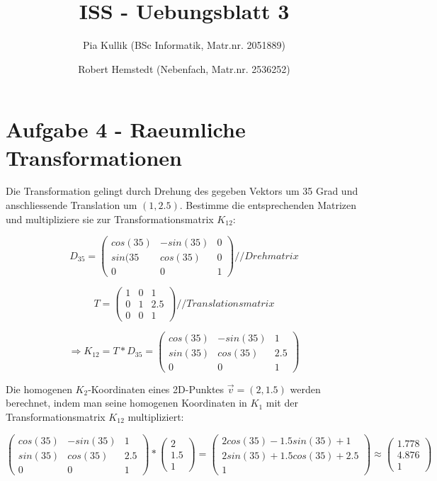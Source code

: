 \documentclass[10pt]{article}
\begin{document}
\title{ISS - Uebungsblatt 3}
\author{Pia Kullik (BSc Informatik, Matr.nr. 2051889) \and Robert Hemstedt (Nebenfach, Matr.nr. 2536252)}
\maketitle

\section{Aufgabe 4 - Raeumliche Transformationen}

Die Transformation gelingt durch Drehung des gegeben Vektors um 35 Grad und anschliessende Translation um $(1, 2.5)$. Bestimme die entsprechenden Matrizen und multipliziere sie zur Transformationsmatrix $K_{12}$:


\[
D_{35} =
\left( {\begin{array}{ccc}
cos(35) & -sin(35) & 0\\
sin(35 & cos(35) & 0\\
0 & 0 & 1
\end{array} } \right) 
//Drehmatrix
\]

\[
T =
\left( {\begin{array}{ccc}
1 & 0 & 1\\
0 & 1 & 2.5 \\
0 & 0 & 1
\end{array} } \right) 
//Translationsmatrix
\]

\[
\Rightarrow K_{12} = T \ast D_{35} =
\left( {\begin{array}{ccc}
cos(35) & -sin(35) & 1\\
sin(35) & cos(35) & 2.5\\
0 & 0 & 1
\end{array} } \right) 
\]


Die homogenen $K_{2}$-Koordinaten eines 2D-Punktes $\vec{v} = (2, 1.5)$ werden berechnet, indem man seine homogenen Koordinaten in $K_{1}$ mit der Transformationsmatrix $K_{12}$ multipliziert:

\[
\left( {\begin{array}{ccc}
cos(35) & -sin(35) & 1\\
sin(35) & cos(35) & 2.5\\
0 & 0 & 1
\end{array} } \right) 
\ast
\left( {\begin{array}{ccc}
2\\
1.5\\
1
\end{array} } \right) 
 = 
\left( {\begin{array}{ccc}
2cos(35) - 1.5sin(35) + 1\\
2sin(35) + 1.5cos(35) + 2.5\\
1
\end{array} } \right) 
\approx
\left( {\begin{array}{ccc}
1.778\\
4.876\\
1
\end{array} } \right)
\]
\end{document}
